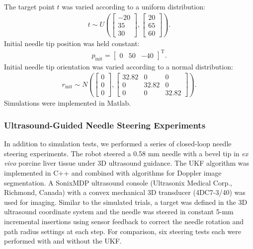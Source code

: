 The target point ${t}$ was varied according to a uniform distribution:
\begin{align}
{t} \sim U\left(
\begin{bmatrix} -20\\ 35\\ 30 \end{bmatrix},
\begin{bmatrix} 20\\ 65\\ 60 \end{bmatrix} \right).
\end{align}
Initial needle tip position was held constant: 
\begin{align*}
{p_{\text{init}}} = \begin{bmatrix} 0 & 50 & -40 \end{bmatrix}^{\text{T}}.
\end{align*}
Initial needle tip orientation was varied according to a normal distribution:
\begin{align}
{r_{\text{init}}} \sim N\left(
\begin{bmatrix} 0\\ 0\\ 0 \end{bmatrix},
\begin{bmatrix} 32.82 & 0 & 0\\ 0 & 32.82 & 0\\ 0 & 0 & 32.82 \end{bmatrix} \right).
\end{align}
Simulations were implemented in Matlab.

\subsubsection{Ultrasound-Guided Needle Steering Experiments}
In addition to simulation tests, we performed a series of closed-loop needle steering experiments. The robot steered a 0.58 mm needle with a bevel tip in \textit{ex vivo} porcine liver tissue under 3D ultrasound guidance. The UKF algorithm was implemented in C++ and combined with algorithms for Doppler image segmentation. A SonixMDP ultrasound console (Ultrasonix Medical Corp., Richmond, Canada) with a convex mechanical 3D transducer (4DC7-3/40) was used for imaging. Similar to the simulated trials, a target was defined in the 3D ultrasound coordinate system and the needle was steered in constant 5-mm incremental insertions using sensor feedback to correct the needle rotation and path radius settings at each step. For comparison, six steering tests each were performed with and without the UKF.

